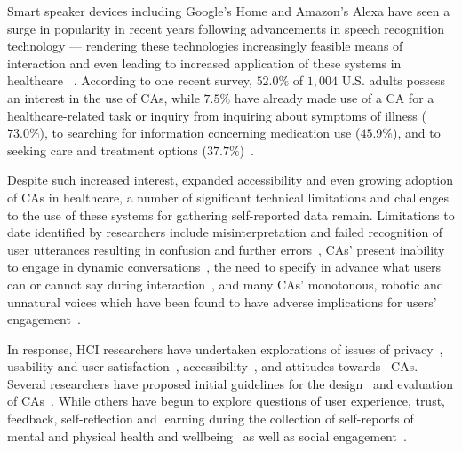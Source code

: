     Smart speaker devices including Google's Home and Amazon's Alexa have seen a surge in popularity in recent years following advancements in speech recognition technology --- rendering these technologies increasingly feasible means of interaction and even leading to increased application of these systems in healthcare ~\cite{laranjo2018conversational, provoost2017embodied, kim2019conversational, kocaballi2020conversational, kocaballi2019personalization,vaidyam2019chatbots}. According to one recent survey, $52.0\%$ of $1,004$ U.S. adults possess an interest in the use of \ac{CA}s, while $7.5\%$ have already made use of a \ac{CA} for a healthcare-related task or inquiry from inquiring about symptoms of illness ($73.0\%$), to searching for information concerning medication use ($45.9\%$), and to seeking care and treatment options ($37.7\%$)~\cite{Voicebot2019}. 
    
    Despite such increased interest, expanded accessibility and even growing adoption of \ac{CA}s in healthcare, a number of significant technical limitations and challenges to the use of these systems for gathering self-reported data remain. Limitations to date identified by researchers include misinterpretation and failed recognition of user utterances resulting in confusion and further errors~\cite{myers2018patterns, suhm2003towards, pyae2018investigating}, \ac{CA}s' present inability to engage in dynamic conversations~\cite{onceakind2019minji}, the need to specify in advance what users can or cannot say during interaction~\cite{pradhan2018accessibility, corbett2016can, Learnability2017Furqan, pradhan2018accessibility}, and many \ac{CA}s' monotonous, robotic and unnatural voices which have been found to have adverse implications for users' engagement~\cite{miner2016smartphone, choice2020julia, persuasive2020Dubiel, nobody2020choi}.
    
    In response, \ac{HCI} researchers have undertaken explorations of issues of privacy~\cite{lau2018alexa}, usability and user satisfaction~\cite{onceakind2019minji}, accessibility~\cite{purington2017alexa}, and attitudes towards~\cite{lopatovska2018personification} \ac{CA}s. Several researchers have proposed initial guidelines for the design~\cite{suhm2003towards, wei2018evaluating, murad2019revolution,clark2019makes} and evaluation of \ac{CA}s~\cite{kocabalil2018measuring}. While others have begun to explore questions of user experience, trust, feedback, self-reflection and learning during the collection of self-reports of mental and physical health and wellbeing~\cite{Rafal2018Workplace, quiroz2020alexa, PublicSpeaking2020Wang} as well as social engagement~\cite{sebastian2017changing, ring2015social, porcheron2018voice}. 
    
